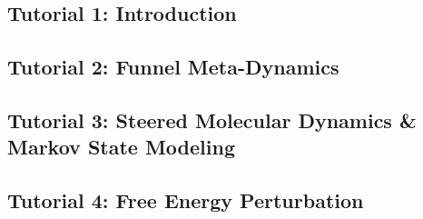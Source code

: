 \documentclass[9pt,tutorial]{livecoms}
\begin{document}
\subsection{Tutorial 1: Introduction}






\subsection{Tutorial 2: Funnel Meta-Dynamics}

\subsection{Tutorial 3: Steered Molecular Dynamics \& Markov State Modeling}

\subsection{Tutorial 4: Free Energy Perturbation}


%
%
\end{document}
